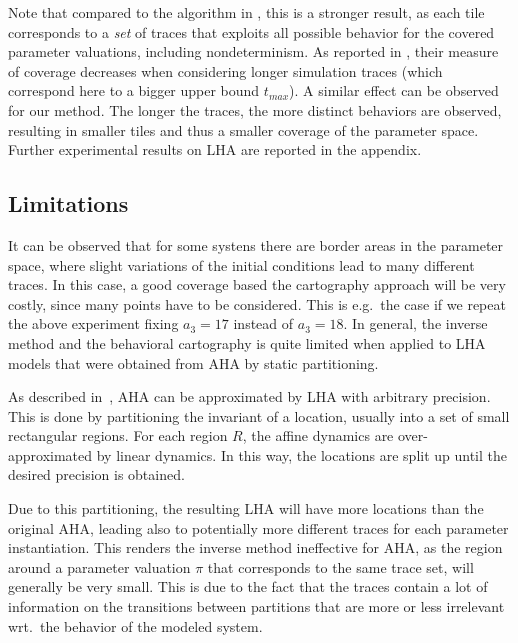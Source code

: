 \documentclass{llncs}
\begin{document}
Note that compared to the algorithm in \cite{AKRS:2008}, this is a
stronger result, as each tile corresponds to a \emph{set} of traces
that exploits all possible behavior for the covered parameter
valuations, including nondeterminism. As reported in \cite{AKRS:2008},
their measure of coverage decreases when considering longer simulation
traces (which correspond here to a bigger upper bound $t_{max}$). A
similar effect can be observed for our method. The longer the traces,
the more distinct behaviors are observed, resulting in smaller tiles
and thus a smaller coverage of the parameter space. Further
experimental results on LHA are reported in the appendix.

\subsection{Limitations} \label{sec:limits}

It can be observed that for some systens there are border areas in the
parameter space, where slight variations of the initial conditions
lead to many different traces. In this case, a good coverage based the
cartography approach will be very costly, since many points have to be
considered. This is e.g.~the case if we repeat the above experiment
fixing $a_3=17$ instead of $a_3=18$. In general, the inverse method
and the behavioral cartography is quite limited when applied to LHA
models that were obtained from AHA by static partitioning.

As described in~\cite{Fre:2008}, AHA can be approximated by LHA with
arbitrary precision. This is done by partitioning the invariant of a
location, usually into a set of small rectangular regions. For each
region $R$, the affine dynamics are over-approximated by linear
dynamics. In this way, the locations are split up until the desired
precision is obtained.

Due to this partitioning, the resulting LHA will have more locations
than the original AHA, leading also to potentially more different
traces for each parameter instantiation. This renders the inverse
method ineffective for AHA, as the region around a parameter
valuation $\pi$ that corresponds to the same trace set, will generally
be very small. This is due to the fact that the traces contain a lot
of information on the transitions between partitions that are more or
less irrelevant wrt.~the behavior of the modeled system.

\end{document}
